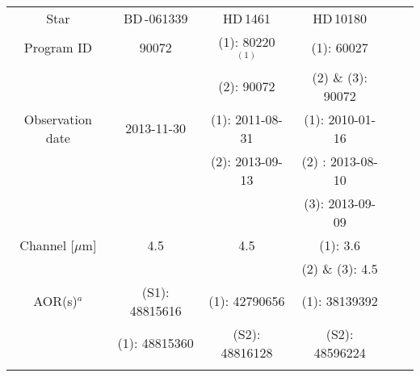 \documentclass[traditabstract]{aa}
\begin{document}
\begin{appendix}
\begin{table*}
\begin{center}
{\scriptsize
\label{tab:targets}
\begin{tabular}{cccccc}
\hline\noalign {\smallskip}
Star &  BD\,-061339 & HD\,1461 & HD\,10180& &    \\ \noalign {\smallskip}
\hline \noalign {\smallskip}  
Program ID                                                          & 90072                                & (1): 80220$^{(1)}$        &  (1): 60027                               & & \\ \noalign {\smallskip} 
                                                                             &                                           & (2): 90072                    &  (2) \& (3): 90072                                & & \\ \noalign {\smallskip} 
Observation date                                                 & 2013-11-30                        & (1): 2011-08-31             &  (1): 2010-01-16                  & & \\ \noalign {\smallskip} 
                                                                            &                                            & (2): 2013-09-13            & (2) : 2013-08-10                   & & \\ \noalign {\smallskip} 
                                                                            &                                            &                                     & (3): 2013-09-09             & & \\ \noalign {\smallskip} 
Channel       [$\mu$m]                                         & 4.5                                      & 4.5                              & (1): 3.6                                  & & \\ \noalign {\smallskip} 
                                                                             &                                           &                                     & (2) \& (3): 4.5                            & & \\ \noalign {\smallskip} 
AOR(s)$^a$                                                         & (S1): 48815616                    & (1): 42790656            & (1): 38139392                      & &  \\ \noalign {\smallskip}                                                                                      
                                                                           & (1): 48815360                      &  (S2): 48816128           & (S2): 48596224                     & &   \\ \noalign {\smallskip} 

\end{tabular}}
\end{center}
\end{table*}
\end{appendix}
\end{document}
